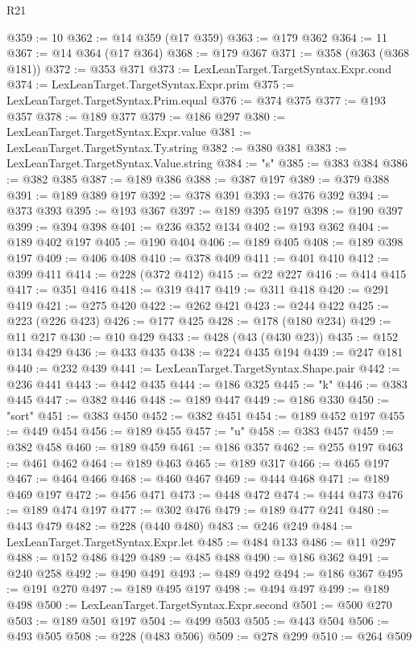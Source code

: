 \begin{lexlean}{R21}
\begin{coremodule}
@359 := 10
@362 := @14 @359 (@17 @359)
@363 := @179 @362
@364 := 11
@367 := @14 @364 (@17 @364)
@368 := @179 @367
@371 := @358 (@363 (@368 @181))
@372 := @353 @371
@373 := LexLeanTarget.TargetSyntax.Expr.cond
@374 := LexLeanTarget.TargetSyntax.Expr.prim
@375 := LexLeanTarget.TargetSyntax.Prim.equal
@376 := @374 @375
@377 := @193 @357
@378 := @189 @377
@379 := @186 @297
@380 := LexLeanTarget.TargetSyntax.Expr.value
@381 := LexLeanTarget.TargetSyntax.Ty.string
@382 := @380 @381
@383 := LexLeanTarget.TargetSyntax.Value.string
@384 := "s"
@385 := @383 @384
@386 := @382 @385
@387 := @189 @386
@388 := @387 @197
@389 := @379 @388
@391 := @189 @389 @197
@392 := @378 @391
@393 := @376 @392
@394 := @373 @393
@395 := @193 @367
@397 := @189 @395 @197
@398 := @190 @397
@399 := @394 @398
@401 := @236 @352 @134
@402 := @193 @362
@404 := @189 @402 @197
@405 := @190 @404
@406 := @189 @405
@408 := @189 @398 @197
@409 := @406 @408
@410 := @378 @409
@411 := @401 @410
@412 := @399 @411
@414 := @228 (@372 @412)
@415 := @22 @227
@416 := @414 @415
@417 := @351 @416
@418 := @319 @417
@419 := @311 @418
@420 := @291 @419
@421 := @275 @420
@422 := @262 @421
@423 := @244 @422
@425 := @223 (@226 @423)
@426 := @177 @425
@428 := @178 (@180 @234)
@429 := @11 @217
@430 := @10 @429
@433 := @428 (@43 (@430 @23))
@435 := @152 @134 @429
@436 := @433 @435
@438 := @224 @435 @194
@439 := @247 @181
@440 := @232 @439
@441 := LexLeanTarget.TargetSyntax.Shape.pair
@442 := @236 @441
@443 := @442 @435
@444 := @186 @325
@445 := "k"
@446 := @383 @445
@447 := @382 @446
@448 := @189 @447
@449 := @186 @330
@450 := "sort"
@451 := @383 @450
@452 := @382 @451
@454 := @189 @452 @197
@455 := @449 @454
@456 := @189 @455
@457 := "u"
@458 := @383 @457
@459 := @382 @458
@460 := @189 @459
@461 := @186 @357
@462 := @255 @197
@463 := @461 @462
@464 := @189 @463
@465 := @189 @317
@466 := @465 @197
@467 := @464 @466
@468 := @460 @467
@469 := @444 @468
@471 := @189 @469 @197
@472 := @456 @471
@473 := @448 @472
@474 := @444 @473
@476 := @189 @474 @197
@477 := @302 @476
@479 := @189 @477 @241
@480 := @443 @479
@482 := @228 (@440 @480)
@483 := @246 @249
@484 := LexLeanTarget.TargetSyntax.Expr.let
@485 := @484 @133
@486 := @11 @297
@488 := @152 @486 @429
@489 := @485 @488
@490 := @186 @362
@491 := @240 @258
@492 := @490 @491
@493 := @489 @492
@494 := @186 @367
@495 := @191 @270
@497 := @189 @495 @197
@498 := @494 @497
@499 := @189 @498
@500 := LexLeanTarget.TargetSyntax.Expr.second
@501 := @500 @270
@503 := @189 @501 @197
@504 := @499 @503
@505 := @443 @504
@506 := @493 @505
@508 := @228 (@483 @506)
@509 := @278 @299
@510 := @264 @509

\end{coremodule}
\end{lexlean}
